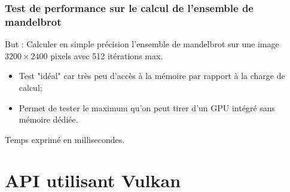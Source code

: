 \documentclass{beamer}
\begin{document}
\begin{frame}[fragile]
\frametitle{Test de performance sur le calcul de l'ensemble de mandelbrot}

\textcolor{BrickRed}{But} : Calculer en simple précision l'ensemble de mandelbrot
sur une image $3200\times2400$ pixels avec 512 itérations max.

\begin{itemize}
\item Test "idéal" car très peu d'accès à la mémoire par rapport à la charge de calcul;
\item Permet de tester le maximum qu'on peut tirer d'un GPU intégré sans mémoire dédiée.
\end{itemize}


Temps exprimé en millisecondes.

\end{frame}

\section{API utilisant Vulkan}
\end{document}
